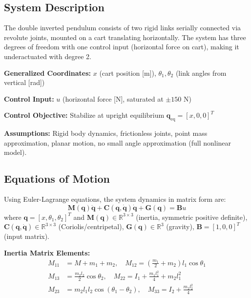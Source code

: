 \documentclass[conference]{IEEEtran}
\begin{document}
\subsection{System Description}

The double inverted pendulum consists of two rigid links serially connected via revolute joints, mounted on a cart translating horizontally. The system has three degrees of freedom with one control input (horizontal force on cart), making it underactuated with degree 2.

\textbf{Generalized Coordinates:} $x$ (cart position [m]), $\theta_1, \theta_2$ (link angles from vertical [rad])

\textbf{Control Input:} $u$ (horizontal force [N], saturated at $\pm 150$ N)

\textbf{Control Objective:} Stabilize at upright equilibrium $\mathbf{q}_{\text{eq}} = [x, 0, 0]^T$

\textbf{Assumptions:} Rigid body dynamics, frictionless joints, point mass approximation, planar motion, no small angle approximation (full nonlinear model).

\subsection{Equations of Motion}

Using Euler-Lagrange equations, the system dynamics in matrix form are:
\begin{equation}
\mathbf{M}(\mathbf{q})\ddot{\mathbf{q}} + \mathbf{C}(\mathbf{q}, \dot{\mathbf{q}})\dot{\mathbf{q}} + \mathbf{G}(\mathbf{q}) = \mathbf{B}u
\end{equation}
where $\mathbf{q} = [x, \theta_1, \theta_2]^T$ and $\mathbf{M}(\mathbf{q}) \in \mathbb{R}^{3 \times 3}$ (inertia, symmetric positive definite), $\mathbf{C}(\mathbf{q}, \dot{\mathbf{q}}) \in \mathbb{R}^{3 \times 3}$ (Coriolis/centripetal), $\mathbf{G}(\mathbf{q}) \in \mathbb{R}^3$ (gravity), $\mathbf{B} = [1, 0, 0]^T$ (input matrix).

\textbf{Inertia Matrix Elements:}
\begin{align}
M_{11} &= M + m_1 + m_2, \quad M_{12} = \left(\frac{m_1}{2} + m_2\right) l_1\cos\theta_1 \nonumber \\
M_{13} &= \frac{m_2 l_2}{2}\cos\theta_2, \quad M_{22} = I_1 + \frac{m_1 l_1^2}{4} + m_2 l_1^2 \nonumber \\
M_{23} &= m_2 l_1 l_2 \cos(\theta_1 - \theta_2), \quad M_{33} = I_2 + \frac{m_2 l_2^2}{4} \nonumber
\end{align}
\end{document}
